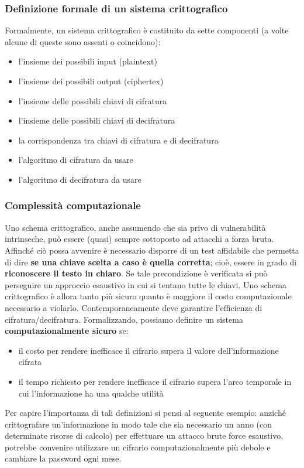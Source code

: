 \subsubsection{Definizione formale di un sistema crittografico} Formalmente, un sistema crittografico è costituito da sette componenti (a volte alcune di queste sono assenti o coincidono):
\begin{itemize} 
  \item l'insieme dei possibili input (plaintext)
  \item l'insieme dei possibili output (ciphertex)
  \item l'insieme delle possibili chiavi di cifratura
  \item l'insieme delle possibili chiavi di decifratura
  \item la corrispondenza tra chiavi di cifratura e di decifratura
  \item l'algoritmo di cifratura da usare
  \item l'algoritmo di decifratura da usare
\end{itemize}

\subsubsection{Complessità computazionale} 
Uno schema crittografico, anche assumendo che sia privo di vulnerabilità intrinseche, può essere (quasi) sempre sottoposto ad attacchi a forza bruta. Affinché ciò possa avvenire è necessario disporre di un test affidabile che permetta di dire \textbf{se una chiave scelta a caso è quella corretta}; cioè, essere in grado di \textbf{riconoscere il testo in chiaro}. Se tale precondizione è verificata si può perseguire un approccio esaustivo in cui si tentano tutte le chiavi. Uno schema crittografico è allora tanto più sicuro quanto è maggiore il costo computazionale necessario a violarlo. Contemporaneamente deve garantire l'efficienza di cifratura/decifratura. Formalizzando, possiamo definire un sistema \textbf{computazionalmente sicuro} se:
\begin{itemize} 
  \item il costo per rendere inefficace il cifrario supera il valore dell'informazione cifrata
  \item il tempo richiesto per rendere inefficace il cifrario supera l'arco temporale in cui l'informazione ha una qualche utilità
\end{itemize}

Per capire l'importanza di tali definizioni si pensi al seguente esempio: anziché crittografare un'informazione in modo tale che sia necessario un anno (con determinate risorse di calcolo) per effettuare un attacco brute force esaustivo, potrebbe convenire utilizzare un cifrario computazionalmente più debole e cambiare la password ogni mese. \\

